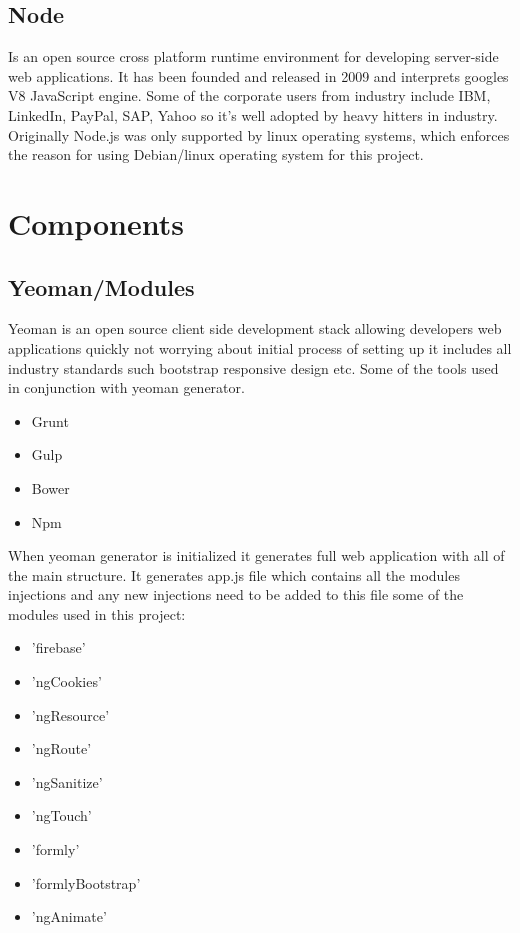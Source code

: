 \begin{itemize}
\subsection{Node}
\bigbreak
Is an open source cross platform runtime environment for developing server-side web applications. It has been founded and released in 2009 and interprets googles V8 JavaScript engine. Some of the corporate users from industry include IBM, LinkedIn, PayPal, SAP, Yahoo so it’s well adopted by heavy hitters in industry. Originally Node.js was only supported by linux operating systems, which enforces the reason for using Debian/linux operating system for this project.


\section{Components}
\subsection{Yeoman/Modules}
\bigbreak
Yeoman is an open source client side development stack allowing developers web applications quickly not worrying about initial process of setting up it includes all industry standards such bootstrap responsive design etc. Some of the tools used in conjunction with yeoman generator.

\begin{itemize}

	\item Grunt 
	\item Gulp
	\item Bower
	\item Npm

\end{itemize}

When yeoman generator is initialized it generates full web application with all of the main structure. 
It generates app.js file which contains all the modules injections and any new injections need to be added to this file some of the modules used in this project:

\begin{itemize}
	
	\item 'firebase' 
	\item 'ngCookies'
	\item 'ngResource'
	\item 'ngRoute'
	\item 'ngSanitize' 
	\item 'ngTouch'
	\item 'formly'
	\item 'formlyBootstrap'
	\item 'ngAnimate'
	

\end{itemize}
\end{itemize}
